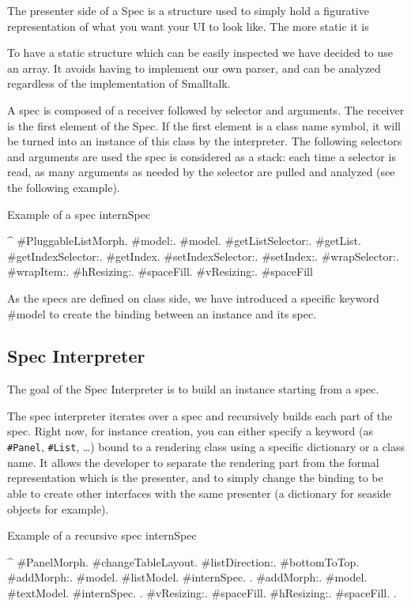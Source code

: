 \documentclass[a4paper,10pt,twoside]{book}
\begin{document}
The presenter side of a Spec is a structure used to simply hold a figurative representation of what you want your UI to look like. The more static it is

To have a static structure which can be easily inspected we have decided to use an array. It avoids having to implement our own parser, and can be analyzed regardless of the implementation of Smalltalk.

A spec is composed of a receiver followed by selector and arguments. The receiver is the first element of the Spec. If the first element is a class name symbol, it will be turned into an instance of this class by the interpreter. The following selectors and arguments are used  the spec is considered as a stack: each time a selector is read, as many arguments as needed by the selector are pulled and analyzed (see the following example).

\begin{method}{Example of a spec}
internSpec

	^ {#PluggableListMorph.
	    	#model:.			  	  #model.
			#getListSelector:.	  #getList.
			#getIndexSelector:.	#getIndex.
			#setIndexSelector:.	#setIndex:.
			#wrapSelector:.	  	 #wrapItem:.
			#hResizing:.			#spaceFill.
			#vResizing:.			#spaceFill		}
\end{method} 

As the specs are defined on class side, we have introduced a specific keyword \#model to create the binding between an instance and its spec.

\subsection{Spec Interpreter}

The goal of the Spec Interpreter is to build an instance starting from a spec.

The spec interpreter iterates over a spec and recursively builds each part of the spec. Right now, for instance creation, you can either specify a keyword (as \verb+#Panel+, \verb+#List+, \dots) bound to a rendering class using a specific dictionary or a class name. It allows the developer to separate the rendering part from the formal representation which is the presenter, and to simply change the binding to be able to create other interfaces with the same presenter (a dictionary for seaside objects for example).

\begin{method}{Example of a recursive spec}
internSpec

	^	{  #PanelMorph.
			#changeTableLayout.
			#listDirection:. #bottomToTop.
			#addMorph:.   { #model. #listModel. #internSpec.	 }.
			#addMorph:.	  { #model. #textModel. #internSpec. 	}.
			#vResizing:. 	#spaceFill.
			#hResizing:. 	#spaceFill.	}.
\end{method} 
\end{document}
